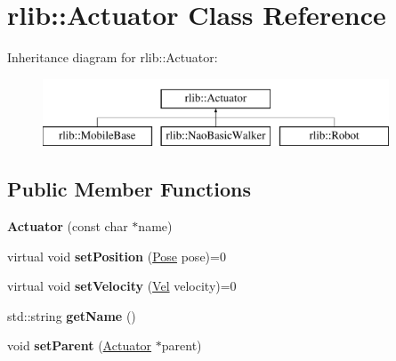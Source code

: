 \hypertarget{classrlib_1_1Actuator}{\section{rlib\-:\-:Actuator Class Reference}
\label{classrlib_1_1Actuator}
}
Inheritance diagram for rlib\-:\-:Actuator\-:\begin{figure}[H]
\begin{center}
\leavevmode
\includegraphics[height=2.000000cm]{classrlib_1_1Actuator}
\end{center}
\end{figure}
\subsection*{Public Member Functions}
\begin{DoxyCompactItemize}
\item 
\hypertarget{classrlib_1_1Actuator_a4586932cf12e921639b5186b12f87866}{{\bfseries Actuator} (const char $\ast$name)}\label{classrlib_1_1Actuator_a4586932cf12e921639b5186b12f87866}

\item 
\hypertarget{classrlib_1_1Actuator_a99eafe0706d84c5aed5d9cc3832996a5}{virtual void {\bfseries set\-Position} (\hyperlink{classrlib_1_1Pose}{Pose} pose)=0}\label{classrlib_1_1Actuator_a99eafe0706d84c5aed5d9cc3832996a5}

\item 
\hypertarget{classrlib_1_1Actuator_a8495e9dee469245fa6eba719b047cb3f}{virtual void {\bfseries set\-Velocity} (\hyperlink{classrlib_1_1Vel}{Vel} velocity)=0}\label{classrlib_1_1Actuator_a8495e9dee469245fa6eba719b047cb3f}

\item 
\hypertarget{classrlib_1_1Actuator_af4694ce3e4474e27bda1ed39cc048b6e}{std\-::string {\bfseries get\-Name} ()}\label{classrlib_1_1Actuator_af4694ce3e4474e27bda1ed39cc048b6e}

\item 
\hypertarget{classrlib_1_1Actuator_aaba68f5222df9f7878538b36daad068f}{void {\bfseries set\-Parent} (\hyperlink{classrlib_1_1Actuator}{Actuator} $\ast$parent)}\label{classrlib_1_1Actuator_aaba68f5222df9f7878538b36daad068f}

\end{DoxyCompactItemize}
